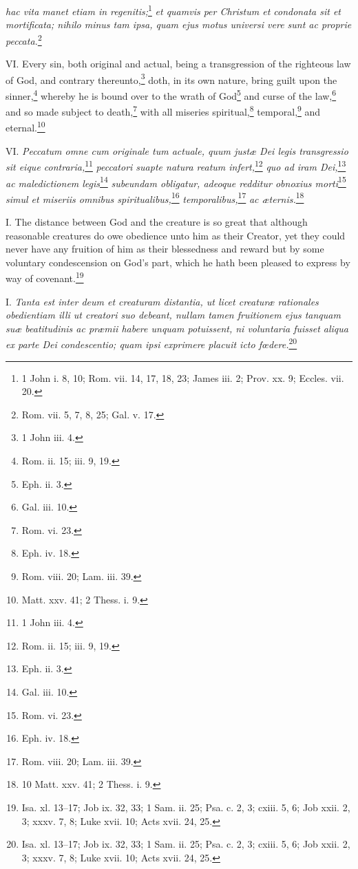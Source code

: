 \emph{hac vita manet etiam in regenitis;}\footnote{1 John i. 8, 10; Rom. vii. 14, 17, 18, 23; James iii. 2; Prov. xx. 9; Eccles. vii. 20.}\emph{ et quamvis per Christum et condonata sit et mortificata; nihilo minus tam ipsa, quam ejus motus universi vere sunt ac proprie peccata.}\footnote{Rom. vii. 5, 7, 8, 25; Gal. v. 17.}

VI. Every sin, both original and actual, being a transgression of the righteous law of God, and contrary thereunto,\footnote{1 John iii. 4.} doth, in its own nature, bring guilt upon the sinner,\footnote{Rom. ii. 15; iii. 9, 19.} whereby he is bound over to the wrath of God\footnote{Eph. ii. 3.} and curse of the law,\footnote{Gal. iii. 10.} and so made subject to death,\footnote{Rom. vi. 23.} with all miseries spiritual,\footnote{Eph. iv. 18.} temporal,\footnote{Rom. viii. 20; Lam. iii. 39.} and eternal.\footnote{Matt. xxv. 41; 2 Thess. i. 9.}

VI. \emph{Peccatum omne cum originale tum actuale, quum justæ Dei legis transgressio sit eique contraria,}\footnote{1 John iii. 4.}\emph{ peccatori suapte natura reatum infert,}\footnote{Rom. ii. 15; iii. 9, 19.}\emph{ quo ad iram Dei,}\footnote{Eph. ii. 3.}\emph{ ac maledictionem legis}\footnote{Gal. iii. 10.}\emph{ subeundam obligatur, adeoque redditur obnoxius morti}\footnote{Rom. vi. 23.}\emph{ simul et miseriis omnibus spiritualibus,}\footnote{Eph. iv. 18.}\emph{ temporalibus,}\footnote{Rom. viii. 20; Lam. iii. 39.}\emph{ ac æternis.}\footnote{10 Matt. xxv. 41; 2 Thess. i. 9.}


I. The distance between God and the creature is so great that although reasonable creatures do owe obedience unto him as their Creator, yet they could never have any fruition of him as their blessedness and reward but by some voluntary condescension on God's part, which he hath been pleased to express by way of covenant.\footnote{Isa. xl. 13–17; Job ix. 32, 33; 1 Sam. ii. 25; Psa. c. 2, 3; cxiii. 5, 6; Job xxii. 2, 3; xxxv. 7, 8; Luke xvii. 10; Acts xvii. 24, 25.}

I. \emph{Tanta est inter deum et creaturam distantia, ut licet creaturæ rationales obedientiam illi ut creatori suo debeant, nullam tamen fruitionem ejus tanquam suæ beatitudinis ac præmii habere unquam potuissent, ni voluntaria fuisset aliqua ex parte Dei condescentio; quam ipsi exprimere placuit icto fœdere.}\footnote{Isa. xl. 13–17; Job ix. 32, 33; 1 Sam. ii. 25; Psa. c. 2, 3; cxiii. 5, 6; Job xxii. 2, 3; xxxv. 7, 8; Luke xvii. 10; Acts xvii. 24, 25.}

